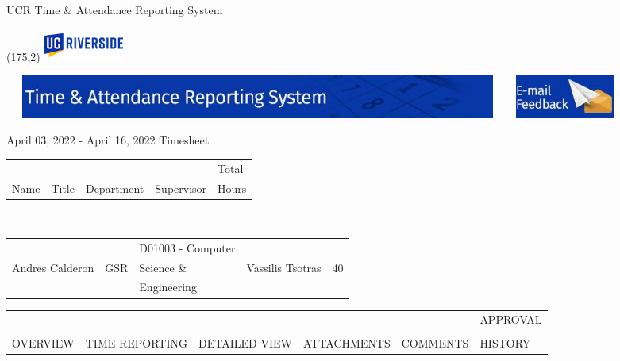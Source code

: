 \documentclass{article}
\begin{document}
\vspace{0.5cm}
\begin{center}
UCR Time \& Attendance Reporting System
\end{center}

\begin{textblock}{20}(175,2)
    \includegraphics[width=75pt,height=30pt]{latexImage_7fbf2b7b584b6a1336a02995be0fda2e.png}
\end{textblock}

\noindent \includegraphics[width=475pt,height=40pt]{latexImage_27cdb919c08fde06af0ea4f32e9b0b4a.png}\includegraphics[width=105pt,  height=40pt]{latexImage_4bdc976671d95a1b7e024dfbd0cca2f2.png}

\begin{center}
    April 03, 2022 - April 16, 2022 Timesheet
    \begin{tabular}{  C{4cm}  C{2cm} C{4cm} C{4cm} C{2cm}  }
        & & & & Total \\
        Name & Title & Department & Supervisor & Hours \\
    \end{tabular} \\
    {
        \setlength\arrayrulewidth{1.5pt}
    \begin{tabular}{  | C{4cm} | C{2cm} | C{4cm} | C{4cm} | C{2cm} | }
            \hline
            & & \small D01003 - Computer & & \\
            Andres Calderon & GSR & \small Science \& & Vassilis Tsotras & 40 \\
            & & \small Engineering & & \\
            \hline
        \end{tabular}
    } 
\end{center}

\vspace{0.5cm}
{
    \fontsize{6}{1}\selectfont
    \begin{tabularx}{0.8\textwidth}{  X  X  X  X  X  X  }
        & & & & & APPROVAL \\ \\
        OVERVIEW & TIME REPORTING & DETAILED VIEW & ATTACHMENTS & COMMENTS & HISTORY \\
    \end{tabularx}
}
\end{document}
